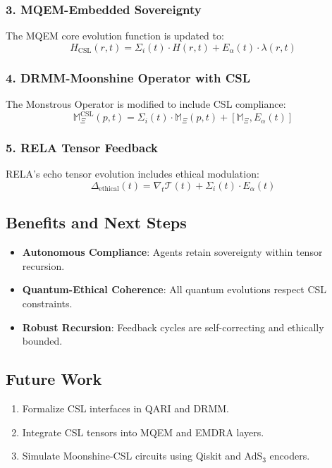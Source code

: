 \documentclass[12pt]{article}
\begin{document}
\subsubsection*{3. MQEM-Embedded Sovereignty}
The MQEM core evolution function is updated to:
\[
H_{\text{CSL}}(r, t) = \Sigma_i(t) \cdot H(r, t) + E_\alpha(t) \cdot \lambda(r, t)
\]

\subsubsection*{4. DRMM-Moonshine Operator with CSL}
The Monstrous Operator is modified to include CSL compliance:
\[
\mathbb{M}_\Xi^{\text{CSL}}(p, t) = \Sigma_i(t) \cdot \mathbb{M}_\Xi(p, t) + [\mathbb{M}_\Xi, E_\alpha(t)]
\]

\subsubsection*{5. RELA Tensor Feedback}
RELA’s echo tensor evolution includes ethical modulation:
\[
\Delta_{\text{ethical}}(t) = \nabla_t \mathcal{T}(t) + \Sigma_i(t) \cdot E_\alpha(t)
\]

\subsection{Benefits and Next Steps}

\begin{itemize}
  \item \textbf{Autonomous Compliance}: Agents retain sovereignty within tensor recursion.
  \item \textbf{Quantum-Ethical Coherence}: All quantum evolutions respect CSL constraints.
  \item \textbf{Robust Recursion}: Feedback cycles are self-correcting and ethically bounded.
\end{itemize}

\subsection*{Future Work}
\begin{enumerate}
  \item Formalize CSL interfaces in QARI and DRMM.
  \item Integrate CSL tensors into MQEM and EMDRA layers.
  \item Simulate Moonshine-CSL circuits using Qiskit and AdS$_3$ encoders.
\end{enumerate}
\end{document}
